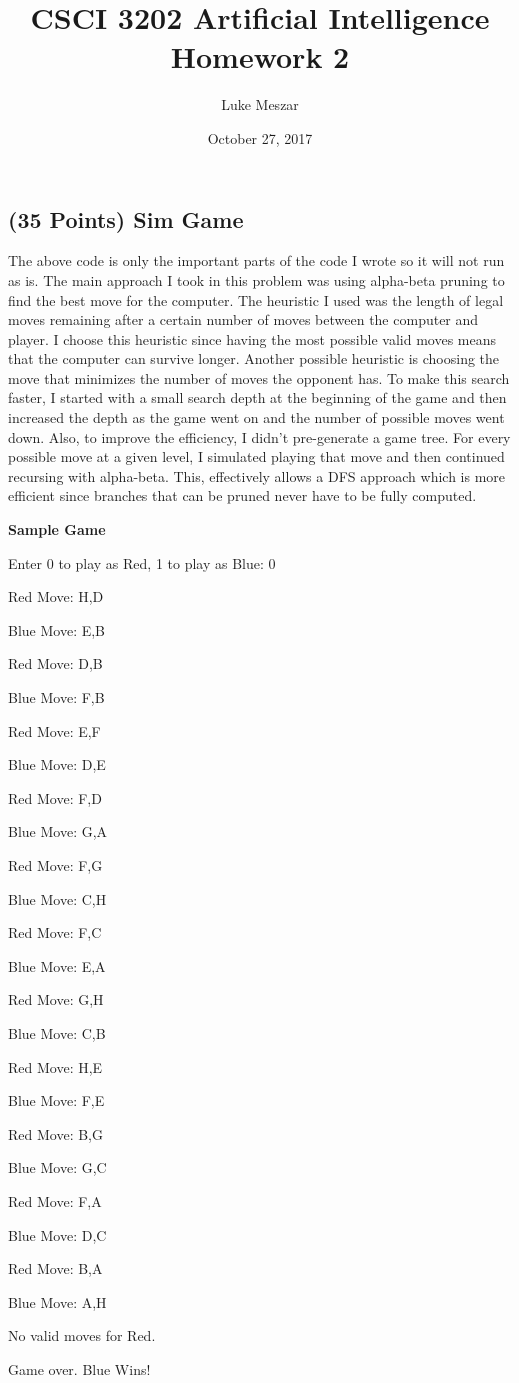 \documentclass{article}
\title{CSCI 3202 Artificial Intelligence Homework 2}
\author{Luke Meszar}
\date{October 27, 2017}
\begin{document}
	\maketitle
	\subsection{(35 Points) Sim Game}
	
	The above code is only the important parts of the code I wrote so it will not run as is. The main approach I took in this problem was using alpha-beta pruning to find the best move for the computer. The heuristic I used was the length of legal moves remaining after a  certain number of moves between the computer and player. I choose this heuristic since having the most possible valid moves means that the computer can survive longer. Another possible heuristic is choosing the move that minimizes the number of moves the opponent has. To make this search faster, I started with a small search depth at the beginning of the game and then increased the depth as the game went on and the number of possible moves went down. Also, to improve the efficiency, I didn't pre-generate a game tree. For every possible move at a given level, I simulated playing that move and then continued recursing with alpha-beta. This, effectively allows a DFS approach which is more efficient since branches that can be pruned never have to be fully computed. 
	
	\textbf{Sample Game}
	
	Enter 0 to play as Red, 1 to play as Blue: 0
	
	Red Move: H,D
	
	Blue Move: E,B
	
	Red Move: D,B 
	
	Blue Move: F,B
	
	Red Move: E,F
	
	Blue Move: D,E
	
	Red Move: F,D
	
	Blue Move: G,A 
	
	Red Move: F,G
	
	Blue Move: C,H
	
	Red Move: F,C
	
	Blue Move: E,A
	
	Red Move: G,H
	
	Blue Move: C,B
	
	Red Move: H,E
	
	Blue Move: F,E
	
	Red Move: B,G
	
	Blue Move: G,C
	
	Red Move: F,A
	
	Blue Move: D,C
	
	Red Move: B,A
	
	Blue Move:  A,H
	
	No valid moves for Red. 
	
	Game over. Blue Wins!
\end{document}
